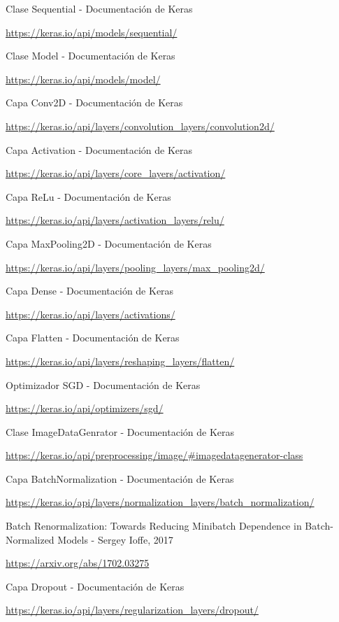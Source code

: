 \documentclass[12pt, spanish]{article}
\begin{document}
\begin{thebibliography}{9}

	Clase Sequential - Documentación de Keras

	\url{https://keras.io/api/models/sequential/}



	Clase Model - Documentación de Keras

	\url{https://keras.io/api/models/model/}


	Capa Conv2D - Documentación de Keras

	\url{https://keras.io/api/layers/convolution_layers/convolution2d/}



	Capa Activation - Documentación de Keras

	\url{https://keras.io/api/layers/core_layers/activation/}


	Capa ReLu - Documentación de Keras

	\url{https://keras.io/api/layers/activation_layers/relu/}


	Capa MaxPooling2D - Documentación de Keras

	\url{https://keras.io/api/layers/pooling_layers/max_pooling2d/}


	Capa Dense - Documentación de Keras

	\url{https://keras.io/api/layers/activations/}


	Capa Flatten - Documentación de Keras

	\url{https://keras.io/api/layers/reshaping_layers/flatten/}


	Optimizador SGD - Documentación de Keras

	\url{https://keras.io/api/optimizers/sgd/}


	Clase ImageDataGenrator - Documentación de Keras

	\url{https://keras.io/api/preprocessing/image/#imagedatagenerator-class}



	Capa BatchNormalization - Documentación de Keras

	\url{https://keras.io/api/layers/normalization_layers/batch_normalization/}



	Batch Renormalization: Towards Reducing Minibatch Dependence in Batch-Normalized Models - Sergey Ioffe, 2017

	\url{https://arxiv.org/abs/1702.03275}



	Capa Dropout - Documentación de Keras

	\url{https://keras.io/api/layers/regularization_layers/dropout/}



\end{thebibliography}
\end{document}

